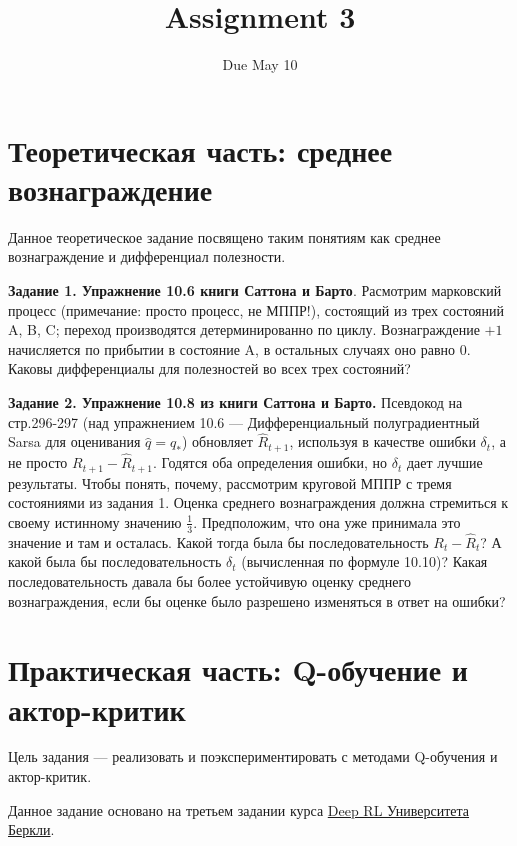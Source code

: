 \documentclass[12pt, oneside]{article}
\author{Due May 10}
\title{Assignment 3}
\date{}
\begin{document}
\maketitle
\thispagestyle{fancy}

\section{Теоретическая часть: среднее вознаграждение}

Данное теоретическое задание посвящено таким понятиям как среднее вознаграждение и дифференциал полезности.

\textbf{Задание 1. Упражнение 10.6 книги Саттона и Барто}. Расмотрим марковский процесс (примечание: просто процесс, не МППР!), состоящий из трех состояний A, B, C; переход производятся детерминированно по циклу. Вознаграждение $+1$ начисляется по прибытии в состояние A, в остальных случаях оно равно 0. Каковы дифференциалы для полезностей во всех трех состояний?

\textbf{Задание 2. Упражнение 10.8 из книги Саттона и Барто.} Псевдокод на стр.296-297 (над упражнением 10.6 --- Дифференциальный полуградиентный Sarsa для оценивания $\hat{q} = q_*$) обновляет $\hat{R}_{t+1}$, используя в качестве ошибки $\delta_t$, а не просто $R_{t+1} - \hat{R}_{t+1}$. Годятся оба определения ошибки, но $\delta_t$ дает лучшие результаты. Чтобы понять, почему, рассмотрим круговой МППР с тремя состояниями из задания 1. Оценка среднего вознаграждения должна стремиться к своему истинному значению $\frac{1}{3}$. Предположим, что она уже принимала это значение и там и осталась. Какой тогда была бы последовательность $R_t - \hat{R}_t$? А какой была бы последовательность $\delta_t$ (вычисленная по формуле 10.10)? Какая последовательность давала бы более устойчивую оценку среднего вознаграждения, если бы оценке было разрешено изменяться в ответ на ошибки?

\section{Практическая часть: Q-обучение и актор-критик}

Цель задания --- реализовать и поэкспериментировать с методами Q-обучения и актор-критик.

Данное задание основано на третьем задании курса \href{http://rail.eecs.berkeley.edu/deeprlcourse/}{Deep RL Университета Беркли}.
\end{document}
